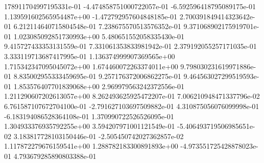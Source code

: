 178911704997195331e-01	-4.474858751000722057e-01	-6.592596418795089175e-01	1.139591602565954487e+00	-1.472792957604848185e-01	2.700391849414323642e-01	6.212114640715804548e-01	7.238675570513576352e-01	9.371068902175919701e-01	1.023085092851730993e+00	5.480651552058335430e-01	9.415727433353131559e-01	7.331061353833981942e-01	2.379192055257171035e-01	3.333119713687417995e-01	1.136374999907369565e+00	1.715342347095045072e+00	1.674460072263374011e+00	9.798030231619971886e-01	8.835002955333459695e-01	9.257176372006862275e-01	9.464563027299519593e-01	1.853576407701839068e+00	2.969979563242372556e-01	1.211290607202613057e+00	8.262493625925472207e-01	7.006210948471337796e-02	6.761587107672704100e-01	-2.791627103697509882e-01	4.310875056076099998e-01	-6.183194086528364108e-01	1.370990722526526095e-01	1.304933376935792255e+00	3.594207971001121549e-01	-5.406493719506985651e-02	3.183817728103150446e-01	-2.505450742027362857e-02	1.117872279676159541e+00	1.288782183300891893e+00	-4.973551725428878023e-01	4.793679285890803388e-01
